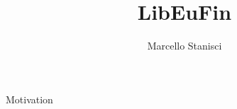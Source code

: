 \documentclass[pdf]{beamer}
\title{LibEuFin}
\author{Marcello Stanisci}
\begin{document}
\begin{frame}
  \titlepage
\end{frame}

\begin{frame}{Motivation}
\end{frame}
\end{document}
